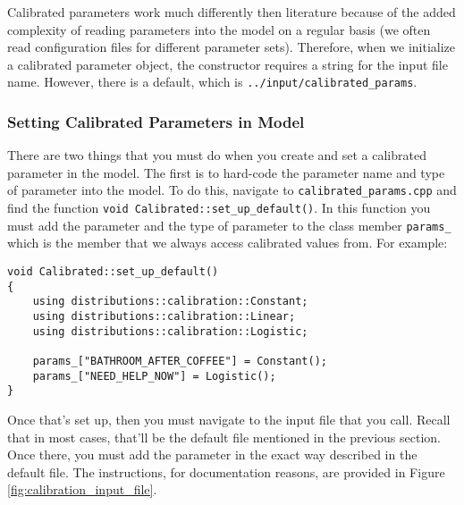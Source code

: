 \documentclass{article}
\begin{document}
Calibrated parameters work much differently then literature because of the added complexity of reading parameters into the model on a regular basis (we often read configuration files for different parameter sets). Therefore, when we initialize a calibrated parameter object, the constructor requires a string for the input file name. However, there is a default, which is \verb|../input/calibrated_params|.

\subsubsection{Setting Calibrated Parameters in Model}

There are two things that you must do when you create and set a calibrated parameter in the model. The first is to hard-code the parameter name and type of parameter into the model. To do this, navigate to \verb|calibrated_params.cpp| and find the function \verb|void Calibrated::set_up_default()|. In this function you must add the parameter and the type of parameter to the class member \verb|params_| which is the member that we always access calibrated values from. For example:

\begin{verbatim}
void Calibrated::set_up_default()
{
    using distributions::calibration::Constant;
    using distributions::calibration::Linear;
    using distributions::calibration::Logistic;

    params_["BATHROOM_AFTER_COFFEE"] = Constant();
    params_["NEED_HELP_NOW"] = Logistic();
}
\end{verbatim}

Once that's set up, then you must navigate to the input file that you call. Recall that in most cases, that'll be the default file mentioned in the previous section. Once there, you must add the parameter in the exact way described in the default file. The instructions, for documentation reasons, are provided in Figure \ref{fig:calibration_input_file}.
\end{document}
